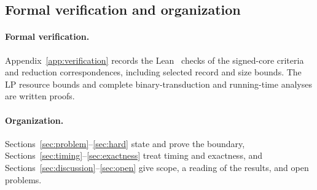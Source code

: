 \subsection{Formal verification and organization}

\paragraph{Formal verification.} Appendix~\ref{app:verification} records the
Lean~\cite{lean4,mathlib} checks of the signed-core criteria and reduction
correspondences, including selected record and size bounds. The LP resource
bounds and complete binary-transduction and running-time analyses are
written proofs.

\paragraph{Organization.} Sections~\ref{sec:problem}--\ref{sec:hard} state
and prove the boundary, Sections~\ref{sec:timing}--\ref{sec:exactness} treat
timing and exactness, and Sections~\ref{sec:discussion}--\ref{sec:open}
give scope, a reading of the results, and open problems.
